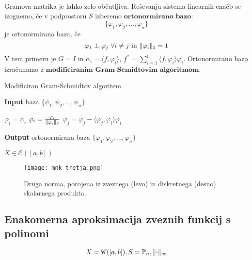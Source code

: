 \documentclass[a4paper,12pt]{article}
\DeclarePairedDelimiter\norm{\lVert}{\rVert}
\newcommand{\innerproduct}[2]{\langle #1, #2 \rangle}
\theoremstyle{definition}
\theoremstyle{remark}
\newcommand{\Pp}{\mathbb{P}}
\begin{document}

Gramova matrika je lahko zelo občutljiva. Reševanju sistema linearnih enačb se izognemo, če v podprostoru $S$ izberemo $\textbf{ortonormirano bazo}$:
\begin{equation*}
    \{\varphi_1, \varphi_2, \dots, \varphi_n\}
\end{equation*}
je ortonormirana baza, če
\begin{equation*}
    \varphi_1 \perp \varphi_j \text{ } \forall i \neq j \text{ in } \norm{\varphi_i}_2 = 1
\end{equation*}
V tem primeru je $G = I$ in $\alpha_i = \innerproduct{f}{\varphi_i}$,  $f^* = \sum_{i = 1}^{n}\innerproduct{f}{\varphi_i} \varphi_i$. Ortonormirano
bazo izračunamo z $\textbf{modificiranim Gram-Scmidtovim algoritmom}$.

\begin{algorithm}
    \caption{Modificiran Gram-Schmidtov algoritem}\label{alg:mgs}
    \hspace*{\algorithmicindent} \textbf{Input} baza $\{\psi_1, \psi_2, \dots, \psi_n\}$
    \begin{algorithmic}[1]
            \State $\varphi_i = \psi_i$
        \EndFor
            \State $\varphi_i = \frac{\varphi_i}{\norm{\varphi_i}_2}$
                \State $\varphi_j = \varphi_j - \innerproduct{\varphi_j}{\varphi_i}\varphi_i$
            \EndFor
        \EndFor
    \end{algorithmic}
    \hspace*{\algorithmicindent} \textbf{Output} ortonormirana baza $\{\varphi_1, \varphi_2, \dots, \varphi_n\}$
\end{algorithm}


$X \in \mathscr{C}([a, b])$
\begin{figure}[H]
    \center
    \texttt{[image: mnk\_tretja.png]}
    \caption{Druga norma, porojena iz zveznega (levo) in diskretnega (desno) skalarnega produkta.}
\end{figure}

\subsection{Enakomerna aproksimacija zveznih funkcij s polinomi}
\begin{equation*}
    X = \mathscr{C} ([a, b]), S = \Pp_n, \norm{\cdot}_{\infty}
\end{equation*}
\end{document}
